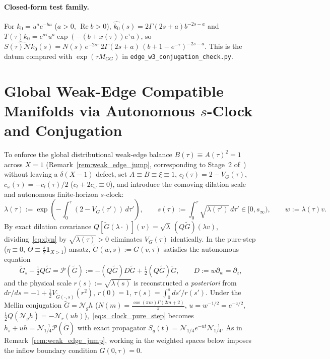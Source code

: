 \documentclass[11pt,a4paper]{article}
\begin{document}
\paragraph{Closed-form test family.}
For $k_0=u^ae^{-bu}$ ($a>0$, $\operatorname{Re}b>0$), $\widehat{k_0}(s)=2\Gamma(2s+a)b^{-2s-a}$ and
$T(\tau)k_0=e^{a\tau}u^a\exp(-(b+x(\tau))e^{\tau}u)$, so
$\widehat{S(\tau)\mathcal{N}k_0}(s)=N(s)\,e^{-2s\tau}\,2\Gamma(2s+a)\,(b+1-e^{-\tau})^{-2s-a}$.
This is the datum compared with $\exp(\tau M_{GG})$ in \texttt{edge\_w3\_conjugation\_check.py}.

\section{Global Weak-Edge Compatible Manifolds via Autonomous $s$-Clock and Conjugation}\label{app:weak_edge_manifolds}

To enforce the global distributional weak-edge balance $B(\tau)\equiv A(\tau)^2=1$ across $X=1$
(Remark~\ref{rem:weak_edge_jump}, corresponding to Stage~2 of~\cite{chen2026houluo}) without leaving
a $\delta(X-1)$ defect, set $A\equiv B\equiv\xi\equiv 1$, $c_l(\tau)=2-V_G(\tau)$,
$c_\omega(\tau)=-c_l(\tau)/2$ ($c_l+2c_\omega\equiv 0$), and introduce the comoving dilation scale
and autonomous finite-horizon $s$-clock:
\[
\lambda(\tau):=\exp\!\left(-\int_0^\tau(2-V_G(\tau'))\,d\tau'\right),\qquad
s(\tau):=\int_0^\tau\sqrt{\lambda(\tau')}\,d\tau'\in[0,s_\infty),\qquad
w:=\lambda(\tau)v.
\]
By exact dilation covariance $Q[\widetilde G(\lambda\cdot)](v)=\sqrt{\lambda}\,(Q\widetilde G)(\lambda v)$,
dividing~\eqref{eq:dyn} by $\sqrt{\lambda(\tau)}>0$ eliminates $V_G(\tau)$ identically.
In the pure-step ($\eta\equiv 0$, $\Theta\equiv\tfrac{\pi}{2}\mathbf{1}_{X>1}$) ansatz,
$\widetilde G(w,s):=G(v,\tau)$ satisfies the autonomous equation
\begin{equation}\label{eq:s_clock_pure_step}
\widetilde G_s-\tfrac12 Q\widetilde G=\mathcal{P}(\widetilde G):=-(Q\widetilde G)D\widetilde G+\tfrac12(Q\widetilde G)\widetilde G,\qquad D:=w\partial_w=\partial_z,
\end{equation}
and the physical scale $r(s):=\sqrt{\lambda(s)}$ is reconstructed \emph{a posteriori} from
$dr/ds=-1+\tfrac12 V_{\widetilde G(\cdot,s)}(r^2)$, $r(0)=1$, $\tau(s)=\int_0^s ds'/r(s')$.
Under the Mellin conjugation $\widetilde G=\mathcal{N}_g h$ ($N(m)=\frac{\cos(\pi m)\Gamma(2m+2)}{\pi}$,
$u=w^{-1/2}=e^{-z/2}$, $\tfrac12 Q(\mathcal{N}_g h)=-\mathcal{N}_r(u h)$),~\eqref{eq:s_clock_pure_step}
becomes $h_s+u h=\mathcal{N}_{1/4}^{-1}\mathcal{P}(\widetilde G)$ with exact propagator
$S_g(t)=\mathcal{N}_{1/4}e^{-ut}\mathcal{N}_{1/4}^{-1}$.  As in Remark~\ref{rem:weak_edge_jump},
working in the weighted spaces below imposes the inflow boundary condition $G(0,\tau)=0$.
\end{document}
